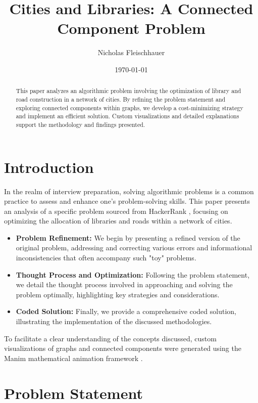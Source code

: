 \documentclass[11pt, a4paper, oneside]{article}
\title{Cities and Libraries: A Connected Component Problem}
\author{Nicholas Fleischhauer}
\date{\today}
\begin{document}
\maketitle

\begin{abstract}
  This paper analyzes an algorithmic problem involving the optimization of library and road construction in a network of cities. By refining the problem statement and exploring connected components within graphs, we develop a cost-minimizing strategy and implement an efficient solution. Custom visualizations and detailed explanations support the methodology and findings presented.
\end{abstract}
  

\section*{Introduction}

In the realm of interview preparation, solving algorithmic problems is a common practice to assess and enhance one's problem-solving skills. This paper presents an analysis of a specific problem sourced from HackerRank \cite{hackerrank}, focusing on optimizing the allocation of libraries and roads within a network of cities.

\begin{itemize}
  \item \textbf{Problem Refinement:} We begin by presenting a refined version of the original problem, addressing and correcting various errors and informational inconsistencies that often accompany such "toy" problems.
  \item \textbf{Thought Process and Optimization:} Following the problem statement, we detail the thought process involved in approaching and solving the problem optimally, highlighting key strategies and considerations.
  \item \textbf{Coded Solution:} Finally, we provide a comprehensive coded solution, illustrating the implementation of the discussed methodologies.
\end{itemize}

To facilitate a clear understanding of the concepts discussed, custom visualizations of graphs and connected components were generated using the Manim mathematical animation framework \cite{manim}.


\section*{Problem Statement}
\end{document}
